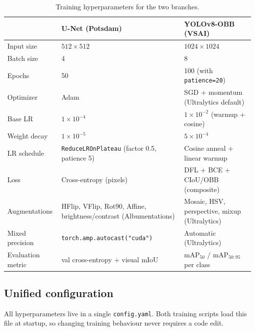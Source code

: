 \documentclass[11pt,a4paper]{article}
\begin{document}
\begin{table}[H]
\centering
\footnotesize
\caption{Training hyperparameters for the two branches.}
\label{tab:hparams}
\begin{tabular}{lll}
\toprule
 & \textbf{U-Net (Potsdam)} & \textbf{YOLOv8-OBB (VSAI)} \\
\midrule
Input size            & $512\times512$                         & $1024\times1024$ \\
Batch size            & 4                                      & 8 \\
Epochs                & 50                                     & 100 (with \texttt{patience=20}) \\
Optimizer             & Adam                                   & SGD + momentum (Ultralytics default) \\
Base LR               & $1\times10^{-4}$                        & $1\times10^{-2}$ (warmup + cosine) \\
Weight decay          & $1\times10^{-5}$                        & $5\times10^{-4}$ \\
LR schedule           & \texttt{ReduceLROnPlateau} (factor 0.5, patience 5) & Cosine anneal + linear warmup \\
Loss                  & Cross-entropy (pixels)                 & DFL + BCE + CIoU/OBB (composite) \\
Augmentations         & HFlip, VFlip, Rot90, Affine, brightness/contrast (Albumentations) & Mosaic, HSV, perspective, mixup (Ultralytics) \\
Mixed precision       & \texttt{torch.amp.autocast("cuda")}    & Automatic (Ultralytics) \\
Evaluation metric     & val cross-entropy + visual mIoU        & mAP$_{50}$ / mAP$_{50:95}$ per class \\
\bottomrule
\end{tabular}
\end{table}

\subsection{Unified configuration}

All hyperparameters live in a single \texttt{config.yaml}. Both training scripts
load this file at startup, so changing training behaviour never requires a code edit.
\end{document}
